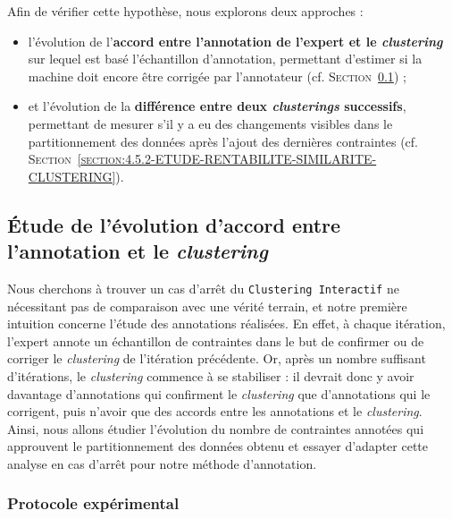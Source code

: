 	Afin de vérifier cette hypothèse, nous explorons deux approches :
	\begin{itemize}
		\item l'évolution de l'\textbf{accord entre l'annotation de l'expert et le \textit{clustering}} sur lequel est basé l'échantillon d'annotation, permettant d'estimer si la machine doit encore être corrigée par l'annotateur  (cf. \textsc{Section~\ref{section:4.5.1-ETUDE-RENTABILITE-ACCORD-ANNOTATION-CLUSTERING}}) ;
		\item et l'évolution de la \textbf{différence entre deux \textit{clusterings} successifs}, permettant de mesurer s'il y a eu des changements visibles dans le partitionnement des données après l'ajout des dernières contraintes (cf. \textsc{Section~\ref{section:4.5.2-ETUDE-RENTABILITE-SIMILARITE-CLUSTERING}}).
	\end{itemize}
	
	
	\subsection{Étude de l'évolution d'accord entre l'annotation et le \textit{clustering}}
	\label{section:4.5.1-ETUDE-RENTABILITE-ACCORD-ANNOTATION-CLUSTERING}
		
		Nous cherchons à trouver un cas d'arrêt du \texttt{Clustering Interactif} ne nécessitant pas de comparaison avec une vérité terrain, et notre première intuition concerne l'étude des annotations réalisées.
		En effet, à chaque itération, l'expert annote un échantillon de contraintes dans le but de confirmer ou de corriger le \textit{clustering} de l'itération précédente.
		Or, après un nombre suffisant d'itérations, le \textit{clustering} commence à se stabiliser : il devrait donc y avoir davantage d'annotations qui confirment le \textit{clustering} que d'annotations qui le corrigent, puis n'avoir que des accords entre les annotations et le \textit{clustering}.
		Ainsi, nous allons étudier l'évolution du nombre de contraintes annotées qui approuvent le partitionnement des données obtenu et essayer d'adapter cette analyse en cas d'arrêt pour notre méthode d'annotation.
	
		\subsubsection{Protocole expérimental}
			
